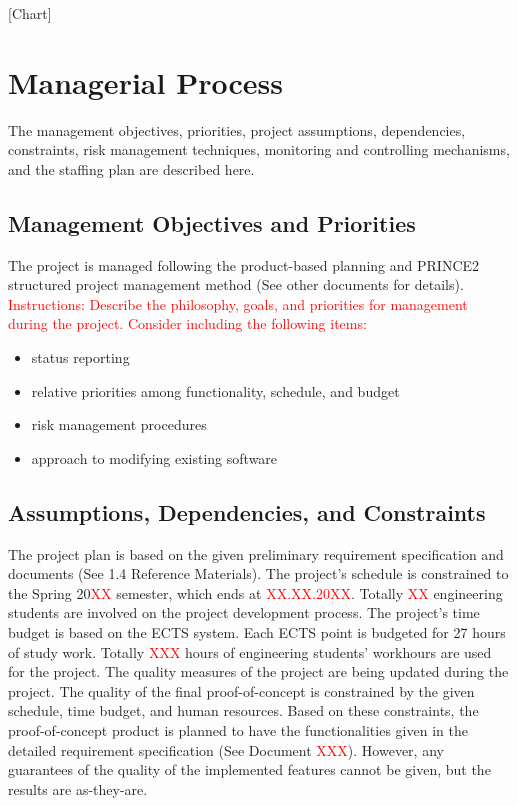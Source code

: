 \documentclass{article}
\begin{document}
[Chart]

\section{Managerial Process}
The management objectives, priorities, project assumptions, dependencies, constraints, risk management techniques, monitoring and controlling mechanisms, and the staffing plan are described here.




\subsection{Management Objectives and Priorities}
The project is managed following the product-based planning and PRINCE2
structured project management method (See other documents for details).
\textcolor{red}{Instructions: Describe the philosophy, goals, and priorities for management
during the project. Consider including the following items:}

\begin{itemize}
\item {\color{red}status reporting}
\item {\color{red}relative priorities among functionality, schedule, and budget}
\item {\color{red}risk management procedures}
\item {\color{red}approach to modifying existing software}
\end{itemize}

\subsection{Assumptions, Dependencies, and Constraints}
The project plan is based on the given preliminary requirement specification and
documents (See 1.4 Reference Materials).
The project’s schedule is constrained to the Spring 20\textcolor{red}{XX} semester, which ends
at \textcolor{red}{XX.XX.20XX}. Totally \textcolor{red}{XX} engineering students are involved on the project
development process.
The project’s time budget is based on the ECTS system. Each ECTS point is
budgeted for 27 hours of study work. Totally \textcolor{red}{XXX} hours of engineering students’
workhours are used for the project.
The quality measures of the project are being updated during the project. The
quality of the final proof-of-concept is constrained by the given schedule, time
budget, and human resources. Based on these constraints, the proof-of-concept
product is planned to have the functionalities given in the detailed requirement
specification (See Document \textcolor{red}{XXX}). However, any guarantees of the quality of the
implemented features cannot be given, but the results are as-they-are.
\end{document}
